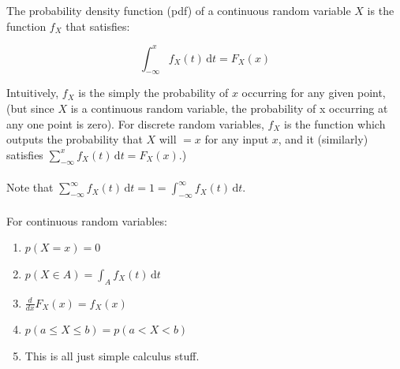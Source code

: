 \documentclass[12pt]{book}
\begin{document}
The probability density function (pdf) of a continuous random variable $X$
is the function $f_X$ that satisfies:

\begin{equation}
	\int_{-\infty}^x  f_X(t)\,\mathrm{d}t = F_X(x) 
\end{equation}

Intuitively, $f_X$ is the simply the probability of $x$ occurring for any given point, (but since $X$ is a continuous random variable, the probability of x occurring at any one point is zero). For discrete random variables, $f_X$ is the function which outputs the probability that $X$ will $= x$ for any input $x$, and it (similarly) satisfies $\sum_{-\infty}^x  f_X(t)\,\mathrm{d}t = F_X(x) $.) 
\\\\
Note that $\sum_{-\infty}^\infty f_X(t)\,\mathrm{d}t = 1 = \int_{-\infty}^\infty f_X(t)\,\mathrm{d}t$.
\\\\
For continuous random variables:
\begin{enumerate}
\item $p(X=x) = 0$
\item $p(X \in A) = \int_{A} f_X(t)\, \mathrm{d}t$
\item $\frac{d}{dx} F_X(x) = f_X(x)$
\item $p(a \leq X \leq b) = p(a < X < b)$
\item This is all just simple calculus stuff.
\\
\end{enumerate}
\end{document}
